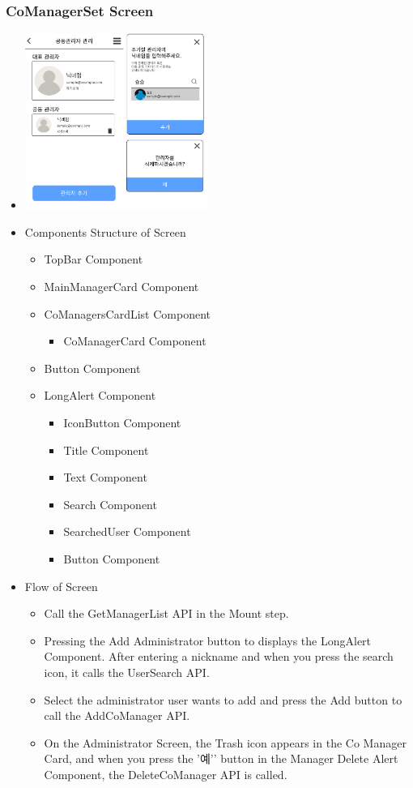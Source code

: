 \documentclass[conference]{IEEEtran}
\begin{document}
\subsubsection{CoManagerSet Screen}
\begin{itemize}
    \item[] \includegraphics[width=0.47\textwidth]{img/D/22.png}
    \item Components Structure of Screen
    \begin{itemize}
        \item TopBar Component
        \item MainManagerCard Component
        \item CoManagersCardList Component
        \begin{itemize}
            \item CoManagerCard Component
        \end{itemize}
        \item Button Component
        \item LongAlert Component
        \begin{itemize}
            \item IconButton Component
            \item Title Component
            \item Text Component
            \item Search Component
            \item SearchedUser Component
            \item Button Component
        \end{itemize}
    \end{itemize}
    \item Flow of Screen
    \begin{itemize}
        \item Call the GetManagerList API in the Mount step.
        \item Pressing the Add Administrator button to displays the LongAlert Component. After entering a nickname and when you press the search icon, it calls the UserSearch API.
        \item Select the administrator user wants to add and press the Add button to call the AddCoManager API.
        \item On the Administrator Screen, the Trash icon appears in the Co Manager Card, and when you press the '예’' button in the Manager Delete Alert Component, the DeleteCoManager API is called.
        \\
    \end{itemize}
\end{itemize}
\end{document}
